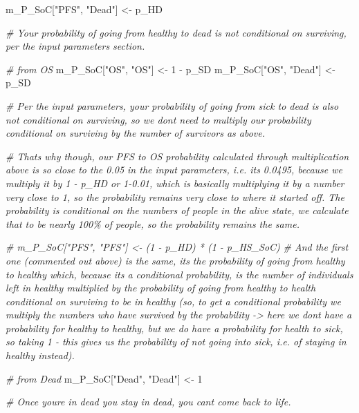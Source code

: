 \documentclass[
]{article}
\newenvironment{Shaded}{\begin{snugshade}}{\end{snugshade}}
\newcommand{\CommentTok}[1]{\textcolor[rgb]{0.56,0.35,0.01}{\textit{#1}}}
\newcommand{\DecValTok}[1]{\textcolor[rgb]{0.00,0.00,0.81}{#1}}
\newcommand{\NormalTok}[1]{#1}
\newcommand{\OtherTok}[1]{\textcolor[rgb]{0.56,0.35,0.01}{#1}}
\newcommand{\SpecialCharTok}[1]{\textcolor[rgb]{0.00,0.00,0.00}{#1}}
\newcommand{\StringTok}[1]{\textcolor[rgb]{0.31,0.60,0.02}{#1}}
\begin{document}
\begin{Shaded}
\begin{Highlighting}[]
\NormalTok{m\_P\_SoC[}\StringTok{"PFS"}\NormalTok{, }\StringTok{"Dead"}\NormalTok{]    }\OtherTok{\textless{}{-}}\NormalTok{      p\_HD}

\CommentTok{\# Your probability of going from healthy to dead is not conditional on surviving, per the input parameters section.}


\CommentTok{\# from OS}
\NormalTok{m\_P\_SoC[}\StringTok{"OS"}\NormalTok{, }\StringTok{"OS"}\NormalTok{] }\OtherTok{\textless{}{-}} \DecValTok{1} \SpecialCharTok{{-}}\NormalTok{ p\_SD}
\NormalTok{m\_P\_SoC[}\StringTok{"OS"}\NormalTok{, }\StringTok{"Dead"}\NormalTok{] }\OtherTok{\textless{}{-}}\NormalTok{     p\_SD}

\CommentTok{\# Per the input parameters, your probability of going from sick to dead is also not conditional on surviving, so we dont need to multiply our probability conditional on surviving by the number of survivors as above.}

\CommentTok{\# That\textquotesingle{}s why though, our PFS to OS probability calculated through multiplication above is so close to the 0.05 in the input parameters, i.e. it\textquotesingle{}s 0.0495, because we multiply it by 1 {-} p\_HD or 1{-}0.01, which is basically multiplying it by a number very close to 1, so the probability remains very close to where it started off. The probability is conditional on the numbers of people in the alive state, we calculate that to be nearly 100\% of people, so the probability remains the same. }


\CommentTok{\# m\_P\_SoC["PFS", "PFS"] \textless{}{-} (1 {-} p\_HD) * (1 {-} p\_HS\_SoC)}
\CommentTok{\# And the first one (commented out above) is the same, it\textquotesingle{}s the probability of going from healthy to healthy which, because it\textquotesingle{}s a conditional probability, is the number of individuals left in healthy multiplied by the probability of going from healthy to health conditional on surviving to be in healthy (so, to get a conditional probability we multiply the numbers who have survived by the probability {-}\textgreater{} here we don\textquotesingle{}t have a probability for healthy to healthy, but we do have a probability for health to sick, so taking 1 {-} this gives us the probability of not going into sick, i.e. of staying in healthy instead). }

\CommentTok{\# from Dead}
\NormalTok{m\_P\_SoC[}\StringTok{"Dead"}\NormalTok{, }\StringTok{"Dead"}\NormalTok{] }\OtherTok{\textless{}{-}} \DecValTok{1}

\CommentTok{\# Once you\textquotesingle{}re in dead you stay in dead, you can\textquotesingle{}t come back to life.}



\end{Highlighting}
\end{Shaded}
\end{document}
